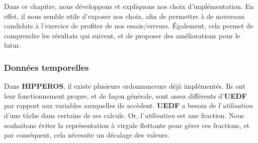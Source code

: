 
	Dans ce chapitre, nous développons et expliquons nos choix d'implémentation.	
	En effet, il nous semble utile d'exposer nos choix, afin de permettre à de nouveaux candidats 
	à l'exercice de profiter de nos essais/erreurs. Également, cela permet de comprendre les 
	résultats qui suivent, et de proposer des améliorations pour le futur.\newline

	\subsubsection{Données temporelles}
	
		Dans \textbf{HIPPEROS}, il existe plusieurs ordonnanceurs déjà implémentés. 
		Ils ont leur fonctionnement propre, et de façon générale, sont assez différents d'\textbf{UEDF} par 
		rapport aux variables auxquelles ils accèdent. 
		\textbf{UEDF} a besoin de l'\textit{utilisation} d'une tâche dans certains de ses calculs. Or, l'\textit{utilisation} 
		est une fraction. Nous souhaitons éviter la représentation à virgule flottante 
		pour gérer ces fractions, et par conséquent, cela nécessite un décalage des valeurs.\newline
		 
